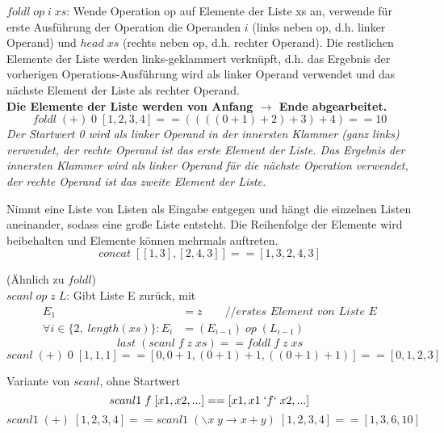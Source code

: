 $foldl\; op\; i\; xs$: Wende Operation op auf Elemente der Liste xs an, verwende für erste Ausführung der Operation die Operanden $i$ (links neben op, d.h. linker Operand) und $head\; xs$ (rechts neben op, d.h. rechter Operand). 
Die restlichen Elemente der Liste werden links-geklammert verknüpft, d.h. das Ergebnis der vorherigen Operations-Ausführung wird als linker Operand verwendet und das nächste Element der Liste als rechter Operand.\\
\textbf{Die Elemente der Liste werden von Anfang $\rightarrow$ Ende abgearbeitet.}
\example
$$foldl\; (+)\; 0\; [1,2,3,4] == ( ( ( (0+1) +2 ) +3 ) +4) == 10$$
\explain
\textit{Der Startwert 0 wird als linker Operand in der innersten Klammer (ganz links) verwendet, der rechte Operand ist das erste Element der Liste. Das Ergebnis der innersten Klammer wird als linker Operand für die nächste Operation verwendet, der rechte Operand ist das zweite Element der Liste.}

Nimmt eine Liste von Listen als Eingabe entgegen und hängt die einzelnen Listen aneinander, sodass eine große Liste entsteht. Die Reihenfolge der Elemente wird beibehalten und Elemente können mehrmals auftreten.
\example
$$concat\; [ [1,3],[2,4,3] ]== [1,3,2,4,3]$$

(Ähnlich zu $foldl$)\\
$scanl\; op\; z\; L$: Gibt Liste E zurück, mit 
\begin{align*} 
E_1 &= z \qquad \textit{//erstes Element von Liste E} \\
\forall i \in \{2,\; length(xs)\} : E_i &= (E_{i-1})\; op\; (L_{i-1})
\end{align*}
\equal
$$last\; (scanl\; f\; z\; xs) == foldl\; f\; z\; xs$$
\example
$$scanl\; (+)\; 0\; [1,1,1] == [0, 0+1,(0+1) +1, ((0+1)+1)] == [0,1,2,3]$$

Variante von $scanl$, ohne Startwert
\example
$$scanl1\; f\; [x1, x2,...] == [x1, x1\; `f`\; x2, ...]$$
$$scanl1\; (+)\; [1,2,3,4] == scanl1\; (\backslash x\; y \rightarrow x+y)\; [1,2,3,4] == [1,3,6,10]$$

